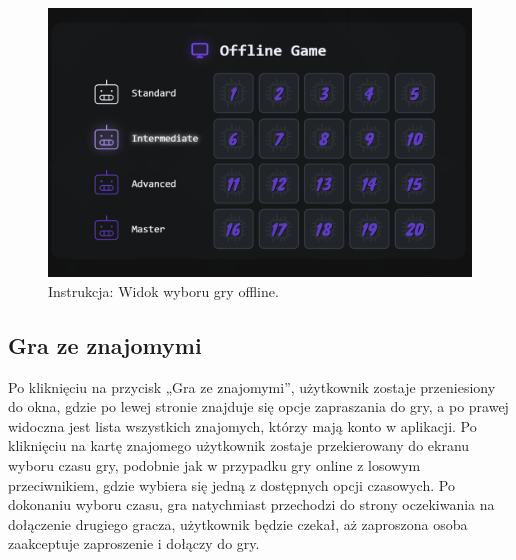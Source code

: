 \documentclass[12pt,a4paper]{article}
\begin{document}
\vspace{0.5cm}
\begin{figure}[h!]
    \centering
    \includegraphics[width=1\textwidth]{images/ins_min_pvc.png}
    \caption{Instrukcja: Widok wyboru gry offline.}
\end{figure}

\newpage

\subsection{Gra ze znajomymi}

\noindent
Po kliknięciu na przycisk „Gra ze znajomymi”, użytkownik zostaje przeniesiony do okna, gdzie po lewej stronie znajduje się opcje zapraszania do gry, a po prawej widoczna jest lista wszystkich znajomych, którzy mają konto w aplikacji. Po kliknięciu na kartę znajomego użytkownik zostaje przekierowany do ekranu wyboru czasu gry, podobnie jak w przypadku gry online z losowym przeciwnikiem, gdzie wybiera się jedną z dostępnych opcji czasowych. Po dokonaniu wyboru czasu, gra natychmiast przechodzi do strony oczekiwania na dołączenie drugiego gracza, użytkownik będzie czekał, aż zaproszona osoba zaakceptuje zaproszenie i dołączy do gry.
\end{document}
